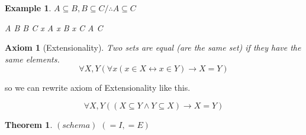 \documentclass[10pt,a4paper]{book}
\newtheorem{theorem}{Theorem}[section]
\newtheorem{axiom}{Axiom}[section]
\newtheorem{example}{Example}[section]
\begin{document}
\begin{example}
    $A \subseteq B , B \subseteq C/\therefore A \subseteq C$
    \begin{fitchproof}[arrayenv=tabular]
         {A \subseteq B }                 
         {B \subseteq C}                  
        \open
         {x \in A }                     
         {x \in B }                     
         {x \in C  }                       
        \close
         {A \subseteq C }             
    \end{fitchproof}
\end{example}


\begin{axiom}
    [Extensionality] Two sets are equal (are the same set) if they have the same elements.
    \\
    \[  \forall X,Y (\forall x ( x \in X \leftrightarrow x \in Y ) \rightarrow X = Y )  \]
\end{axiom}



so we can rewrite axiom of Extensionality like this.

\[ \forall X,Y ((X \subseteq Y \wedge Y \subseteq X) \rightarrow X=Y)\]

\begin{theorem}
    \textbf{$(schema)$} $( = I,  = E)$
\end{theorem}
\end{document}
